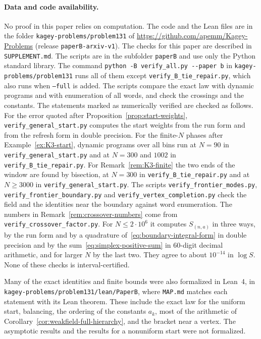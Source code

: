 \documentclass[11pt]{article}
\theoremstyle{definition}
\theoremstyle{remark}
\begin{document}
{\sloppy
\paragraph{Data and code availability.}
No proof in this paper relies on computation. The code and the Lean files are
in the folder \nolinkurl{kagey-problems/problem131} of
\url{https://github.com/apemm/Kagey-Problems} (release
\texttt{paperB-arxiv-v1}). The checks for this paper are described in
\texttt{SUPPLEMENT.md}. The scripts are in the subfolder \texttt{paperB} and use
only the Python standard library. The command
\texttt{python -B verify\_all.py -{}-paper b} in \nolinkurl{kagey-problems/problem131}
runs all of them except \texttt{verify\_B\_tie\_repair.py}, which also runs
when \texttt{--full} is added. The scripts compare the exact law with dynamic
programs and with enumeration of all words, and check the crossings and the
constants. The statements marked as numerically verified are checked as
follows. For the error quoted after Proposition~\ref{prop:start-weights},
\texttt{verify\_general\_start.py} computes the start weights from the run form
and from the refresh form in double precision. For the finite-$N$ phases after
Example~\ref{ex:K3-start}, dynamic programs over all bins run at $N=90$ in
\texttt{verify\_general\_start.py} and at $N=300$ and $1002$ in
\texttt{verify\_B\_tie\_repair.py}. For Remark~\ref{rem:K3-finite} the two ends
of the window are found by bisection, at $N=300$ in
\texttt{verify\_B\_tie\_repair.py} and at $N\ge3000$ in
\texttt{verify\_general\_start.py}. The scripts
\texttt{verify\_frontier\_modes.py}, \texttt{verify\_frontier\_boundary.py} and
\texttt{verify\_vertex\_completion.py} check the field and the identities near
the boundary against word enumeration. The numbers in
Remark~\ref{rem:crossover-numbers} come from \texttt{verify\_crossover\_factor.py}.
For $N\le2\cdot10^6$ it computes $S_{(n,a)}$ in three ways, by the run form and
by a quadrature of~\eqref{eq:boundary-integral-form} in double precision and
by the sum~\eqref{eq:simplex-positive-sum} in 60-digit decimal arithmetic, and
for larger $N$ by the last two. They agree to about $10^{-14}$ in $\log S$.
None of these checks is interval-certified.

Many of the exact identities and finite bounds were also formalized in Lean~4,
in \nolinkurl{kagey-problems/problem131/lean/PaperB}, where \texttt{MAP.md}
matches each statement with its Lean theorem. These include the exact law for
the uniform start, balancing, the ordering of the constants $a_k$, most of the
arithmetic of Corollary~\ref{cor:weakfield-full-hierarchy}, and the bracket near
a vertex. The asymptotic results and the results for a nonuniform start were not
formalized.
\par}
\end{document}
